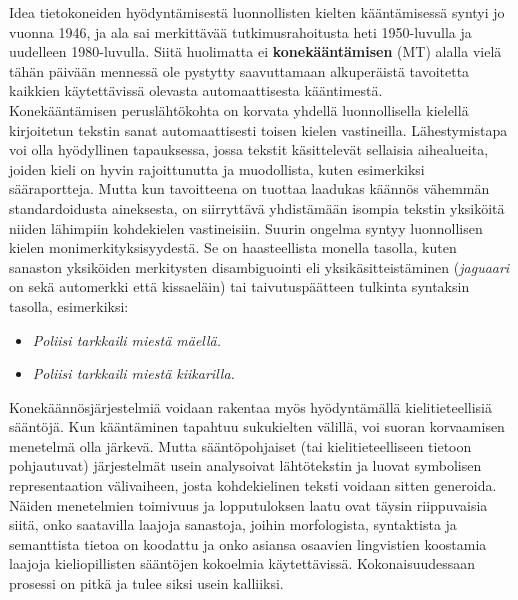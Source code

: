 \begin{multicols}{2}
Idea tietokoneiden hyödyntämisestä luonnollisten kielten
kääntämisessä syntyi jo vuonna 1946, ja ala sai merkittävää 
tutkimusrahoitusta heti 1950-luvulla ja uudelleen 1980-luvulla. Siitä
huolimatta ei \textbf{konekääntämisen} (MT) alalla vielä tähän päivään mennessä
ole pystytty saavuttamaan alkuperäistä tavoitetta kaikkien
käytettävissä olevasta automaattisesta kääntimestä.\\
Konekääntämisen peruslähtökohta on korvata yhdellä luonnollisella
kielellä kirjoitetun tekstin sanat automaattisesti toisen kielen
vastineilla.  Lähestymistapa voi olla hyödyllinen
tapauksessa, jossa tekstit käsittelevät sellaisia aihealueita, joiden
kieli on hyvin rajoittunutta ja muodollista, kuten esimerkiksi
sääraportteja. Mutta kun tavoitteena on tuottaa laadukas käännös
vähemmän standardoidusta aineksesta, on siirryttävä yhdistämään
isompia tekstin yksiköitä niiden lähimpiin kohdekielen
vastineisiin. Suurin ongelma syntyy luonnollisen kielen
monimerkityksisyydestä. Se on haasteellista monella tasolla, kuten
sanaston yksiköiden merkitysten disambiguointi eli
yksikäsitteistäminen (\textit{jaguaari} on sekä automerkki että kissaeläin) tai
taivutuspäätteen tulkinta syntaksin tasolla, esimerkiksi:

\begin{itemize}
\item[] \textit{Poliisi tarkkaili miestä mäellä.}

\item[] \textit{Poliisi tarkkaili miestä kiikarilla.}
\end{itemize}

Konekäännösjärjestelmiä voidaan rakentaa myös hyödyntämällä
kielitieteellisiä sääntöjä. Kun kääntäminen tapahtuu sukukielten
välillä, voi suoran korvaamisen menetelmä olla järkevä. Mutta sääntöpohjaiset (tai
kielitieteelliseen tietoon pohjautuvat) järjestelmät usein analysoivat
lähtötekstin ja luovat symbolisen representaation välivaiheen, josta
kohdekielinen teksti voidaan sitten generoida. Näiden menetelmien
toimivuus ja lopputuloksen laatu ovat täysin riippuvaisia siitä, onko saatavilla laajoja
sanastoja, joihin morfologista, syntaktista ja semanttista tietoa on
koodattu ja onko asiansa osaavien lingvistien koostamia laajoja
kieliopillisten sääntöjen kokoelmia käytettävissä. Kokonaisuudessaan prosessi on
pitkä ja tulee siksi usein kalliiksi.


\end{multicols}
